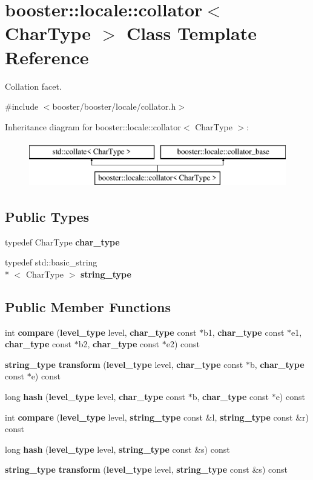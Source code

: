 \section{booster\-:\-:locale\-:\-:collator$<$ Char\-Type $>$ Class Template Reference}
\label{classbooster_1_1locale_1_1collator}


Collation facet.  




{\ttfamily \#include $<$booster/booster/locale/collator.\-h$>$}

Inheritance diagram for booster\-:\-:locale\-:\-:collator$<$ Char\-Type $>$\-:\begin{figure}[H]
\begin{center}
\leavevmode
\includegraphics[height=2.000000cm]{classbooster_1_1locale_1_1collator}
\end{center}
\end{figure}
\subsection*{Public Types}
\begin{DoxyCompactItemize}
\item 
typedef Char\-Type {\bf char\-\_\-type}
\item 
typedef std\-::basic\-\_\-string\\*
$<$ Char\-Type $>$ {\bf string\-\_\-type}
\end{DoxyCompactItemize}
\subsection*{Public Member Functions}
\begin{DoxyCompactItemize}
\item 
int {\bf compare} ({\bf level\-\_\-type} level, {\bf char\-\_\-type} const $\ast$b1, {\bf char\-\_\-type} const $\ast$e1, {\bf char\-\_\-type} const $\ast$b2, {\bf char\-\_\-type} const $\ast$e2) const 
\item 
{\bf string\-\_\-type} {\bf transform} ({\bf level\-\_\-type} level, {\bf char\-\_\-type} const $\ast$b, {\bf char\-\_\-type} const $\ast$e) const 
\item 
long {\bf hash} ({\bf level\-\_\-type} level, {\bf char\-\_\-type} const $\ast$b, {\bf char\-\_\-type} const $\ast$e) const 
\item 
int {\bf compare} ({\bf level\-\_\-type} level, {\bf string\-\_\-type} const \&l, {\bf string\-\_\-type} const \&r) const 
\item 
long {\bf hash} ({\bf level\-\_\-type} level, {\bf string\-\_\-type} const \&s) const 
\item 
{\bf string\-\_\-type} {\bf transform} ({\bf level\-\_\-type} level, {\bf string\-\_\-type} const \&s) const 
\end{DoxyCompactItemize}
